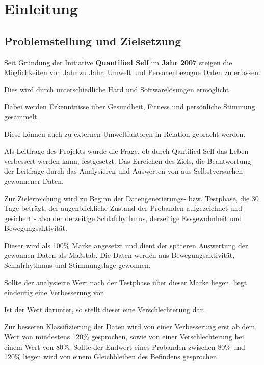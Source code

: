 
\chapter{Einleitung}
\label{ch:Einleitung}

\section{Problemstellung und Zielsetzung}
\label{problemstellung-und-zielsetzung}

Seit Gründung der Initiative \href{http://quantifiedself.com/}{\textbf{Quantified Self}} im \href{http://quantifiedself.com/2011/03/what-is-the-quantified-self/}{\textbf{Jahr 2007}} steigen die Möglichkeiten von Jahr zu Jahr, Umwelt und Personenbezogne Daten zu erfassen. 

Dies wird durch unterschiedliche Hard und Softwarelösungen ermöglicht. 

Dabei werden Erkenntnisse über Gesundheit, Fitness und persönliche Stimmung gesammelt.

Diese können auch zu externen Umweltfaktoren in Relation gebracht werden.

Als Leitfrage des Projekts wurde die Frage, ob durch Qantified Self das Leben verbessert werden kann, festgesetzt. Das Erreichen des Ziels, die Beantwortung der Leitfrage durch das Analysieren und Auswerten von aus Selbstversuchen gewonnener Daten.

Zur Zielerreichung wird zu Beginn der Datengenerierungs- bzw. Testphase, die 30 Tage beträgt, der augenblickliche Zustand der Probanden aufgezeichnet und gesichert - also der derzeitige Schlafrhythmus, derzeitige Essgewohnheit und Bewegungsaktivität. 

Dieser wird als 100\% Marke angesetzt und dient der späteren Auswertung der gewonnen Daten als Maßstab. Die Daten werden aus Bewegungsaktivität, Schlafrhythmus und Stimmungslage gewonnen. 

Sollte der analysierte Wert nach der Testphase über dieser Marke liegen, liegt eindeutig eine Verbesserung vor. 

Ist der Wert darunter, so stellt dieser eine Verschlechterung dar. 

Zur besseren Klassifizierung der Daten wird von einer Verbesserung erst ab dem Wert von mindestens 120\% gesprochen, sowie von einer Verschlechterung bei einem Wert von 80\%. Sollte der Endwert eines Probanden zwischen 80\% und 120\% liegen wird von einem Gleichbleiben des Befindens gesprochen.

